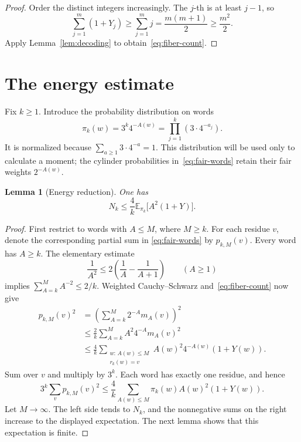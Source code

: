 \documentclass[11pt]{article}
\newtheorem{lemma}[theorem]{Lemma}
\theoremstyle{remark}
\newcommand{\E}{\mathbb E}
\begin{document}
\begin{proof}
Order the distinct integers increasingly.  The \(j\)-th is at
least \(j-1\), so
\[
  \sum_{j=1}^m(1+Y_j)\geq\sum_{j=1}^m j
  =\frac{m(m+1)}2\geq\frac{m^2}2.
\]
Apply Lemma~\ref{lem:decoding} to obtain~\eqref{eq:fiber-count}.
\end{proof}

\section{The energy estimate}

Fix \(k\geq1\).  Introduce the probability distribution on words
\begin{equation}\label{eq:biased-law}
  \pi_k(w)=3^k4^{-A(w)}
         =\prod_{j=1}^k(3\cdot4^{-a_j}).
\end{equation}
It is normalized because \(\sum_{a\geq1}3\cdot4^{-a}=1\).
This distribution will be used only to calculate a moment;
the cylinder probabilities in~\eqref{eq:fair-words} retain their fair
weights \(2^{-A(w)}\).

\begin{lemma}[Energy reduction]\label{lem:energy-reduction}
One has
\begin{equation}\label{eq:energy-moment}
  N_k\leq\frac4k\E_{\pi_k}\bigl[A^2(1+Y)\bigr].
\end{equation}
\end{lemma}

\begin{proof}
First restrict to words with \(A\leq M\), where \(M\geq k\).
For each residue \(v\), denote the corresponding partial sum in
\eqref{eq:fair-words} by \(p_{k,M}(v)\).  Every word has \(A\geq k\).
The elementary estimate
\[
  \frac1{A^2}\leq2\left(\frac1A-\frac1{A+1}\right)\qquad(A\geq1)
\]
implies \(\sum_{A=k}^{M}A^{-2}\leq2/k\).  Weighted
Cauchy--Schwarz and~\eqref{eq:fiber-count} now give
\begin{align*}
  p_{k,M}(v)^2
  &=\left(\sum_{A=k}^{M}2^{-A}m_A(v)\right)^2\\
  &\leq\frac2k\sum_{A=k}^{M}A^2 4^{-A}m_A(v)^2\\
  &\leq\frac4k\sum_{\substack{w:\,A(w)\leq M\\r_k(w)=v}}
                   A(w)^2 4^{-A(w)}(1+Y(w)).
\end{align*}
Sum over \(v\) and multiply by \(3^k\).  Each word has exactly
one residue, and hence
\[
  3^k\sum_v p_{k,M}(v)^2
  \leq\frac4k\sum_{A(w)\leq M}\pi_k(w)A(w)^2(1+Y(w)).
\]
Let \(M\to\infty\).  The left side tends to \(N_k\), and the
nonnegative sums on the right increase to the displayed expectation.
The next lemma shows that this expectation is finite.
\end{proof}
\end{document}
